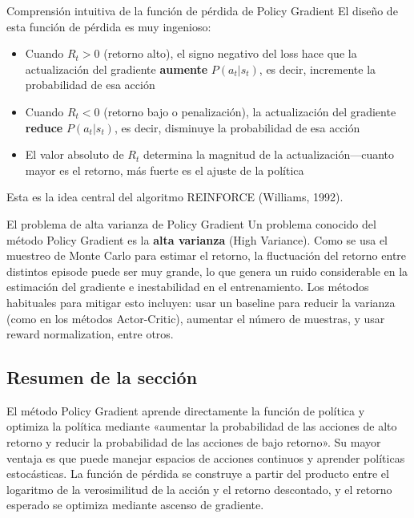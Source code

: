 \begin{importantbox}{Comprensión intuitiva de la función de pérdida de Policy Gradient}
El diseño de esta función de pérdida es muy ingenioso:
\begin{itemize}
    \item Cuando $R_t > 0$ (retorno alto), el signo negativo del loss hace que la actualización del gradiente \textbf{aumente} $P(a_t|s_t)$, es decir, incremente la probabilidad de esa acción
    \item Cuando $R_t < 0$ (retorno bajo o penalización), la actualización del gradiente \textbf{reduce} $P(a_t|s_t)$, es decir, disminuye la probabilidad de esa acción
    \item El valor absoluto de $R_t$ determina la magnitud de la actualización—cuanto mayor es el retorno, más fuerte es el ajuste de la política
\end{itemize}
Esta es la idea central del algoritmo REINFORCE (Williams, 1992).
\end{importantbox}

\begin{warningbox}{El problema de alta varianza de Policy Gradient}
Un problema conocido del método Policy Gradient es la \textbf{alta varianza} (High Variance). Como se usa el muestreo de Monte Carlo para estimar el retorno, la fluctuación del retorno entre distintos episode puede ser muy grande, lo que genera un ruido considerable en la estimación del gradiente e inestabilidad en el entrenamiento. Los métodos habituales para mitigar esto incluyen: usar un baseline para reducir la varianza (como en los métodos Actor-Critic), aumentar el número de muestras, y usar reward normalization, entre otros.
\end{warningbox}

\subsection{Resumen de la sección}

El método Policy Gradient aprende directamente la función de política y optimiza la política mediante «aumentar la probabilidad de las acciones de alto retorno y reducir la probabilidad de las acciones de bajo retorno». Su mayor ventaja es que puede manejar espacios de acciones continuos y aprender políticas estocásticas. La función de pérdida se construye a partir del producto entre el logaritmo de la verosimilitud de la acción y el retorno descontado, y el retorno esperado se optimiza mediante ascenso de gradiente.

